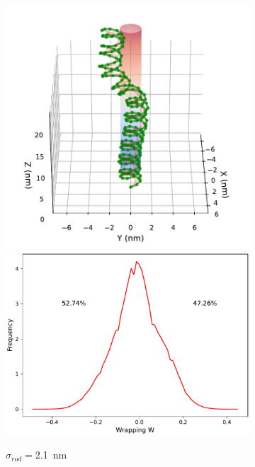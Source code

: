 \documentclass[a4paper,10pt]{article}
\begin{document}
\begin{figure}[htbp]
\centering
\begin{subfigure}{.3\textwidth}
\includegraphics[width=\textwidth]{r2_A_2000000_16.pdf}
\includegraphics[width=\textwidth]{r2_A_wr_pr.pdf}
\caption{$\sigma_{rod}=$\SI{2.1}{\nm}}
\label{fig:r2_a}
\end{subfigure}
\begin{subfigure}{.3\textwidth}

\end{subfigure}
\end{figure}
\end{document}
